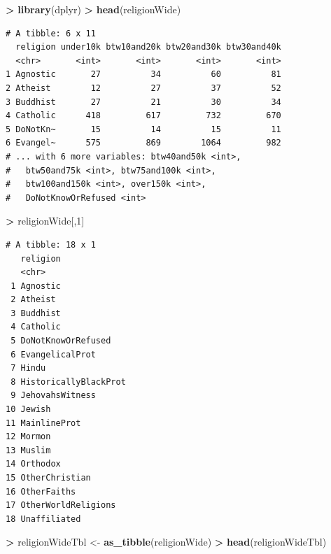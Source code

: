 \documentclass[
]{krantz}
\makeatletter
\newenvironment{Shaded}{\begin{snugshade}}{\end{snugshade}}
\newcommand{\DecValTok}[1]{\textcolor[rgb]{0.06,0.06,0.06}{#1}}
\newcommand{\KeywordTok}[1]{\textcolor[rgb]{0.27,0.27,0.27}{\textbf{#1}}}
\newcommand{\NormalTok}[1]{#1}
\newcommand{\OperatorTok}[1]{\textcolor[rgb]{0.43,0.43,0.43}{\textbf{#1}}}
\newcommand{\StringTok}[1]{\textcolor[rgb]{0.5,0.5,0.5}{#1}}
\newenvironment{kframe}{%
\medskip{}
\setlength{\fboxsep}{.8em}
 \def\at@end@of@kframe{}%
 \ifinner\ifhmode%
  \def\at@end@of@kframe{\end{minipage}}%
  \begin{minipage}{\columnwidth}%
 \fi\fi%
 \def\FrameCommand##1{\hskip\@totalleftmargin \hskip-\fboxsep
 \colorbox{shadecolor}{##1}\hskip-\fboxsep
     \hskip-\linewidth \hskip-\@totalleftmargin \hskip\columnwidth}%
 \MakeFramed {\advance\hsize-\width
   \@totalleftmargin\z@ \linewidth\hsize
   \@setminipage}}%
 {\par\unskip\endMakeFramed%
 \at@end@of@kframe}
\renewenvironment{Shaded}{\begin{kframe}}{\end{kframe}}
\makeatother
\begin{document}
\begin{Shaded}
\begin{Highlighting}[]
\OperatorTok{\textgreater{}}\StringTok{ }\KeywordTok{library}\NormalTok{(dplyr)}
\OperatorTok{\textgreater{}}\StringTok{ }\KeywordTok{head}\NormalTok{(religionWide)}
\end{Highlighting}
\end{Shaded}

\begin{verbatim}
# A tibble: 6 x 11
  religion under10k btw10and20k btw20and30k btw30and40k
  <chr>       <int>       <int>       <int>       <int>
1 Agnostic       27          34          60          81
2 Atheist        12          27          37          52
3 Buddhist       27          21          30          34
4 Catholic      418         617         732         670
5 DoNotKn~       15          14          15          11
6 Evangel~      575         869        1064         982
# ... with 6 more variables: btw40and50k <int>,
#   btw50and75k <int>, btw75and100k <int>,
#   btw100and150k <int>, over150k <int>,
#   DoNotKnowOrRefused <int>
\end{verbatim}

\begin{Shaded}
\begin{Highlighting}[]
\OperatorTok{\textgreater{}}\StringTok{ }\NormalTok{religionWide[,}\DecValTok{1}\NormalTok{]}
\end{Highlighting}
\end{Shaded}

\begin{verbatim}
# A tibble: 18 x 1
   religion             
   <chr>                
 1 Agnostic             
 2 Atheist              
 3 Buddhist             
 4 Catholic             
 5 DoNotKnowOrRefused   
 6 EvangelicalProt      
 7 Hindu                
 8 HistoricallyBlackProt
 9 JehovahsWitness      
10 Jewish               
11 MainlineProt         
12 Mormon               
13 Muslim               
14 Orthodox             
15 OtherChristian       
16 OtherFaiths          
17 OtherWorldReligions  
18 Unaffiliated         
\end{verbatim}

\begin{Shaded}
\begin{Highlighting}[]
\OperatorTok{\textgreater{}}\StringTok{ }\NormalTok{religionWideTbl \textless{}{-}}\StringTok{ }\KeywordTok{as\_tibble}\NormalTok{(religionWide)}
\OperatorTok{\textgreater{}}\StringTok{ }\KeywordTok{head}\NormalTok{(religionWideTbl)}
\end{Highlighting}
\end{Shaded}
\end{document}
